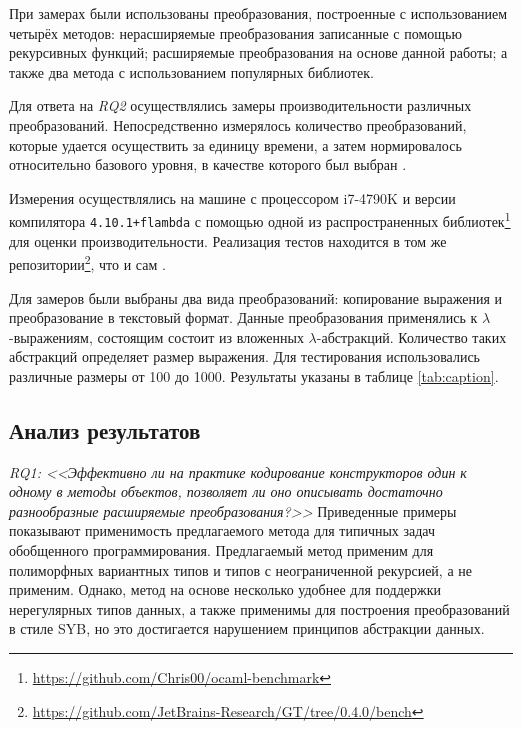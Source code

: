%



При замерах были использованы преобразования, построенные с использованием четырёх методов:
нерасширяемые преобразования записанные с помощью рекурсивных функций;
расширяемые преобразования на основе данной работы; 
а также два метода с использованием популярных библиотек.

Для ответа на \textit{RQ2} осуществлялись замеры производительности различных преобразований. Непосредственно измерялось количество преобразований, которые удается осуществить за единицу времени, а затем нормировалось относительно базового уровня, в качестве которого был выбран \GT{}.

Измерения осуществлялись на машине с процессором i7-4790K и версии компилятора \texttt{4.10.1+flambda} с помощью одной из распространенных библиотек\footnote{\url{https://github.com/Chris00/ocaml-benchmark}} для оценки производительности. Реализация тестов находится в том же репозитории\footnote{\url{https://github.com/JetBrains-Research/GT/tree/0.4.0/bench}}, что и сам \GT{}.

Для замеров были выбраны два вида преобразований: копирование выражения и преобразование в текстовый формат.
Данные преобразования применялись к $\lambda$-выражениям, состоящим состоит из вложенных $\lambda$-абстракций.
Количество таких абстракций определяет размер выражения. Для тестирования использовались различные размеры от 100 до 1000.
Результаты указаны в таблице \ref{tab:caption}.

\subsection{Анализ результатов}
\emph{RQ1: <<Эффективно ли  на практике кодирование конструкторов один к одному в методы объектов, позволяет ли оно описывать достаточно разнообразные расширяемые преобразования?>>} Приведенные примеры показывают применимость  предлагаемого метода для типичных задач обобщенного программирования. Предлагаемый метод применим для полиморфных вариантных типов \OCaml{} и типов с неограниченной рекурсией, а \Visitors{} не применим. Однако, метод на основе \Visitors{} несколько удобнее для поддержки нерегулярных типов данных, а также \Visitors{} применимы для построения преобразований в стиле SYB\cite{SYB}, но это достигается нарушением принципов абстракции данных.

